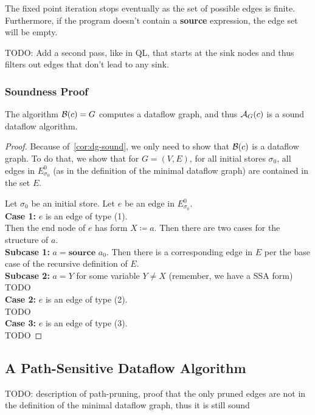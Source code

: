 The fixed point iteration stops eventually as the set of possible edges is
finite. Furthermore, if the program doesn't contain a \textbf{source} expression,
the edge set will be empty.

TODO: Add a second pass, like in QL, that starts at the sink nodes and thus
filters out edges that don't lead to any sink.

\subsubsection*{Soundness Proof}
\begin{theorem}
    The algorithm $\operatorname{\mathcal{B}}(c) = G$ computes a dataflow graph, and thus 
    $\operatorname{\mathcal{A}}_G(c)$ is a sound dataflow algorithm.
\end{theorem}
\begin{proof}
    Because of~\autoref{cor:dg-sound}, we only need to show that $\operatorname{\mathcal{B}}(c)$ is 
    a dataflow graph.
    To do that, we show that for $G=(V, E)$, for all initial stores $\sigma_0$,
    all edges in $E^0_{\sigma_0}$ (as in the definition of the minimal dataflow
    graph) are contained in the set $E$.

    Let $\sigma_0$ be an initial store.
    Let $e$ be an edge in $E^0_{\sigma_0}$.\\
    \textbf{Case 1:} $e$ is an edge of type (1).\\
    Then the end node of $e$
    has form $X \coloneqq a$.
    Then there are two cases for the structure of $a$.\\
    \textbf{Subcase 1:} $a = \textbf{source }a_0$.
    Then there is a corresponding edge in $E$ per the base case of the recursive
    definition of $E$.\\
    \textbf{Subcase 2:} $a = Y$ for some variable $Y \neq X$ (remember, we have 
    a SSA form)
    TODO\\
    \textbf{Case 2:} $e$ is an edge of type (2).\\
    TODO\\
    \textbf{Case 3:} $e$ is an edge of type (3).\\
    TODO
\end{proof}


\subsection{A Path-Sensitive Dataflow Algorithm}
TODO: description of path-pruning, proof that the only pruned edges are not
in the definition of the minimal dataflow graph, thus it is still sound

